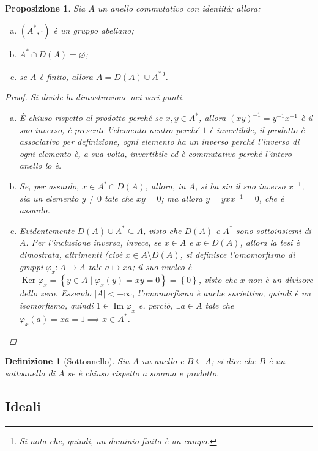 \documentclass[12pt]{scrartcl}
\theoremstyle{style}
\newtheorem{definizione}{Definizione}[section]
\newtheorem{prop}{Proposizione}[section]
\numberwithin{equation}{subsection}
\begin{document}
\begin{prop}
	Sia $A $ un anello commutativo con identit\`a; allora:
	\begin{enumerate}[(a).]
		\item $(A^*,\cdot )$ \`e un gruppo abeliano;
		\item $A^* \cap D(A) = \varnothing$;
		\item se $A$ \`e finito, allora $A = D(A) \cup A^*$\footnote{Si nota che, quindi, un dominio finito \`e un campo.}.
	\end{enumerate}
	\begin{proof}Si divide la dimostrazione nei vari punti.
		\begin{enumerate}[(a).]
			\item \`E chiuso rispetto al prodotto perch\'e se $x,y \in A^*$, allora $(xy)^{-1}=y^{-1}x^{-1}$ \`e il suo inverso, \`e presente l'elemento neutro perch\'e $1 $ \`e invertibile, il prodotto \`e associativo per definizione, ogni elemento ha un inverso perch\'e l'inverso di ogni elemento \`e, a sua volta, invertibile ed \`e commutativo perch\'e l'intero anello lo \`e.
			\item Se, per assurdo, $x \in A^* \cap D(A)$, allora, in $A$, si ha sia il suo inverso $x^{-1}$, sia un elemento $y\neq 0$ tale che $xy = 0$; ma allora $y = y x x^{-1} = 0$, che \`e assurdo.
			\item Evidentemente $D(A) \cup A^* \subseteq A$, visto che $D(A)$ e $A^*$ sono sottoinsiemi di $A$.
				Per l'inclusione inversa, invece, se $x \in A$ e $x \in D(A)$, allora la tesi \`e dimostrata, altrimenti (cio\`e $x \in A \setminus D(A)$, si definisce l'omomorfismo di gruppi $\varphi _x : A \to A$ tale $a\longmapsto xa$; il suo nucleo \`e $\operatorname{Ker} \varphi_x  = \left\{ y \in  A  \mid \varphi _x(y) = xy = 0 \right\} = \left\{ 0 \right\} $, visto che $x$ non \`e un divisore dello zero.
				Essendo $|A|<+\infty$, l'omomorfismo \`e anche suriettivo, quindi \`e un isomorfismo, quindi $1 \in \operatorname{Im} \varphi _x$ e, perci\`o, $\exists a \in A$ tale che $\varphi _x (a) = xa = 1\implies x \in A^*$.
		\end{enumerate}
	\end{proof}
\end{prop}
\begin{definizione}
	[Sottoanello]
	Sia $A$ un anello e $B \subseteq A$; si dice che $B$ \`e un \textit{sottoanello} di $A$ se \`e chiuso rispetto a somma e prodotto.
\end{definizione}
\subsection{Ideali}
\end{document}

